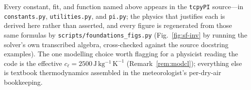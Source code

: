 \documentclass[11pt,a4paper]{article}
\theoremstyle{definition}
\newcommand{\JkgK}{\,\mathrm{J\,kg^{-1}\,K^{-1}}}
\newcommand{\cl}{c_\ell}
\begin{document}
Every constant, fit, and function named above appears in the \texttt{tcpyPI}
source---in \texttt{constants.py}, \texttt{utilities.py}, and \texttt{pi.py};
the physics that justifies each is derived here rather than asserted, and every
figure is regenerated from those same formulas by
\texttt{scripts/foundations\_figs.py} (Fig.~\ref{fig:sf-inv} by running the
solver's own transcribed algebra, cross-checked against the source docstring
examples). The one modelling choice
worth flagging for a physicist reading the code is the effective
$\cl=2500\JkgK$ (Remark~\ref{rem:modcl}); everything else is textbook
thermodynamics assembled in the meteorologist's per-dry-air bookkeeping.
\end{document}
